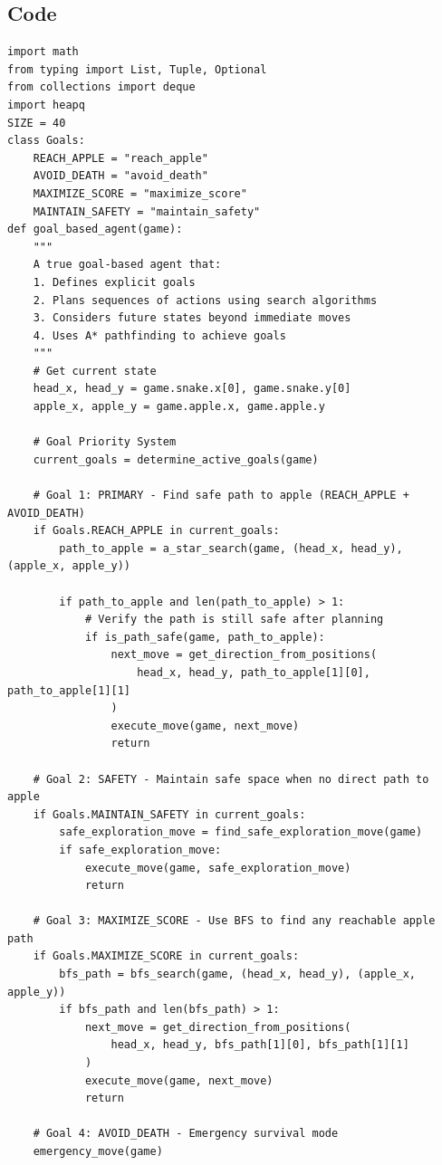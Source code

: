 \documentclass[11pt,a4paper]{article}
\begin{document}
\subsection{Code}
\begin{lstlisting}[caption=Goal-Based Agent]
import math
from typing import List, Tuple, Optional
from collections import deque
import heapq
SIZE = 40
class Goals:
    REACH_APPLE = "reach_apple"
    AVOID_DEATH = "avoid_death"
    MAXIMIZE_SCORE = "maximize_score"
    MAINTAIN_SAFETY = "maintain_safety"
def goal_based_agent(game):
    """
    A true goal-based agent that:
    1. Defines explicit goals
    2. Plans sequences of actions using search algorithms
    3. Considers future states beyond immediate moves
    4. Uses A* pathfinding to achieve goals
    """
    # Get current state
    head_x, head_y = game.snake.x[0], game.snake.y[0]
    apple_x, apple_y = game.apple.x, game.apple.y

    # Goal Priority System
    current_goals = determine_active_goals(game)

    # Goal 1: PRIMARY - Find safe path to apple (REACH_APPLE + AVOID_DEATH)
    if Goals.REACH_APPLE in current_goals:
        path_to_apple = a_star_search(game, (head_x, head_y), (apple_x, apple_y))

        if path_to_apple and len(path_to_apple) > 1:
            # Verify the path is still safe after planning
            if is_path_safe(game, path_to_apple):
                next_move = get_direction_from_positions(
                    head_x, head_y, path_to_apple[1][0], path_to_apple[1][1]
                )
                execute_move(game, next_move)
                return

    # Goal 2: SAFETY - Maintain safe space when no direct path to apple
    if Goals.MAINTAIN_SAFETY in current_goals:
        safe_exploration_move = find_safe_exploration_move(game)
        if safe_exploration_move:
            execute_move(game, safe_exploration_move)
            return

    # Goal 3: MAXIMIZE_SCORE - Use BFS to find any reachable apple path
    if Goals.MAXIMIZE_SCORE in current_goals:
        bfs_path = bfs_search(game, (head_x, head_y), (apple_x, apple_y))
        if bfs_path and len(bfs_path) > 1:
            next_move = get_direction_from_positions(
                head_x, head_y, bfs_path[1][0], bfs_path[1][1]
            )
            execute_move(game, next_move)
            return

    # Goal 4: AVOID_DEATH - Emergency survival mode
    emergency_move(game)
\end{lstlisting}
\end{document}
